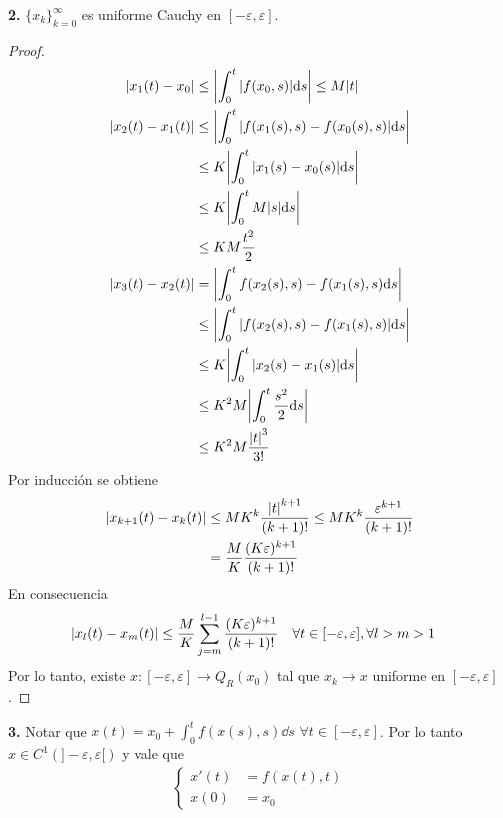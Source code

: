 \documentclass{article}
\begin{document}
\textbf{2.}
$\{x_k\}_{k = 0}^{\infty}$ es uniforme Cauchy en $[- \varepsilon, \varepsilon]$.
\begin{proof}
\allowdisplaybreaks
\begin{align}
    \abs{x_{1}(t) - x_0}
        &\leq
        \abs{\int_0^t \abs{f(x_0, s)} \dd s}
        \leq M \abs{t}
    \\
    \abs{x_2(t) - x_1(t)}
        &\leq
        \abs{\int_0^t \abs{f(x_1(s), s) - f(x_0(s), s)} \dd s}
    \\
        &\leq
        K \abs{\int_0^t \abs{x_1(s) - x_0(s)} \dd s}
    \\
        &\leq
        K \abs{\int_0^t M \abs{s} \dd s}
    \\
        &\leq K M \frac{t^2}{2}
    \\
    \abs{x_3(t) - x_2(t)}
        &=
        \abs{\int_0^t f(x_2(s), s) - f(x_1(s), s) \dd s}
    \\
        &\leq
        \abs{\int_0^t \abs{f(x_2(s), s) - f(x_1(s), s)} \dd s}
    \\
        &\leq
        K \abs{\int_0^t \abs{x_2(s) - x_1(s)} \dd s}
    \\
        &\leq
        K^2 M \abs{\int_0^t \frac{s^2}{2} \dd s}
    \\
        &\leq
        K^2 M \frac{\abs{t}^3}{3!}
\end{align}
Por inducción se obtiene
\begin{align}
    \abs{x_{k + 1}(t) - x_k(t)}
    &\leq
    M K^k \frac{\abs{t}^{k + 1}}{(k + 1)!}
    \leq
    M K^k \frac{\varepsilon^{k + 1}}{(k + 1)!}
    \\
    &=
    \frac{M}{K} \frac{(K \varepsilon)^{k + 1}}{(k + 1)!}
\end{align}
En consecuencia
\begin{align}
    &\abs{x_l(t) - x_m(t)}
    \leq
    \frac{M}{K} \sum_{j = m}^{l - 1} \frac{(K \varepsilon)^{k + 1}}{(k + 1)!}
    && \forall t\in [- \varepsilon, \varepsilon], \forall l > m > 1
\end{align}
Por lo tanto, existe $x : [- \varepsilon, \varepsilon] \rightarrow Q_R(x_0)$ tal que $x_k \rightarrow x$ uniforme en $[- \varepsilon, \varepsilon]$.
\end{proof}

\textbf{3.}
Notar que $x(t) = x_0 + \int_0^t f(x(s), s) \dd s$ $\forall t \in [- \varepsilon, \varepsilon]$.
Por lo tanto $x \in C^1(]- \varepsilon, \varepsilon[)$ y vale que
\begin{align}
    \left\{\begin{aligned}
    x'(t) &= f(x(t), t) \\
    x(0) &= x_0
    \end{aligned}\right.
\end{align}
\end{document}
